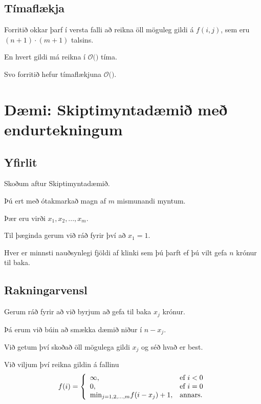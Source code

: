 \subsection{Tímaflækja}
{
    {
        \item<1-> Forritið okkar þarf í versta falli að reikna öll möguleg gildi á $f(i, j)$, sem eru $(n + 1) \cdot (m + 1)$ talsins.
        \item<2-> En hvert gildi má reikna í $\mathcal{O}($$)$ tíma.
        \item<4-> Svo forritið hefur tímaflækjuna $\mathcal{O}($$)$.
    }
}

\section{Dæmi: Skiptimyntadæmið með endurtekningum}
\subsection{Yfirlit}
{
    {
        \item<1-> Skoðum aftur Skiptimyntadæmið.
        \item<2-> Þú ert með ótakmarkað magn af $m$ mismunandi myntum.
        \item<3-> Þær eru virði $x_1, x_2, ..., x_m$.
        \item<4-> Til þæginda gerum við ráð fyrir því að $x_1 = 1$.
        \item<5-> Hver er minnsti nauðsynlegi fjöldi af klinki sem þú þarft ef þú vilt gefa $n$ krónur til baka.
    }
}

\subsection{Rakningarvensl}
{
    {
        \item<1-> Gerum ráð fyrir að við byrjum að gefa til baka $x_j$ krónur.
        \item<2-> Þá erum við búin að smækka dæmið niður í $n - x_j$.
        \item<3-> Við getum því skoðað öll mögulega gildi $x_j$ og séð hvað er best.
        \item<4-> Við viljum því reikna gildin á fallinu
        \[
            f(i) = 
            \left \{
            \env{array}
            {
                {l l}
                \infty, & \text{ef $i < 0$}\\
                0, & \text{ef $i = 0$}\\
                \text{min}_{j = 1, 2, ..., m} f(i - x_j) + 1, & \text{annars}.
            }
            \right .
        \]
    }
}

